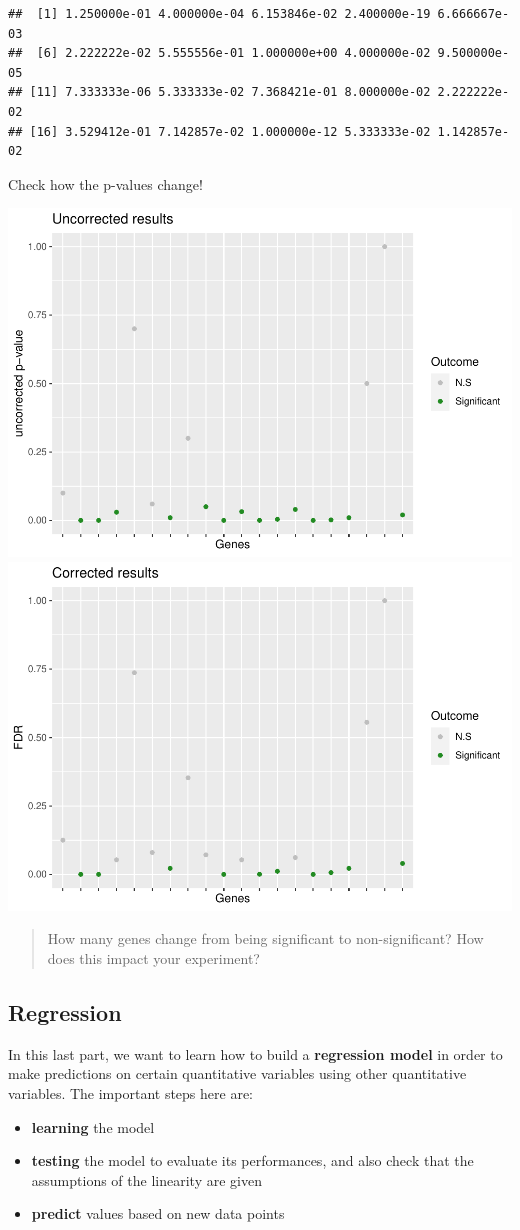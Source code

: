 \documentclass[
]{book}
\providecommand{\tightlist}{%
  \setlength{\itemsep}{0pt}\setlength{\parskip}{0pt}}
\begin{document}
\begin{verbatim}
##  [1] 1.250000e-01 4.000000e-04 6.153846e-02 2.400000e-19 6.666667e-03
##  [6] 2.222222e-02 5.555556e-01 1.000000e+00 4.000000e-02 9.500000e-05
## [11] 7.333333e-06 5.333333e-02 7.368421e-01 8.000000e-02 2.222222e-02
## [16] 3.529412e-01 7.142857e-02 1.000000e-12 5.333333e-02 1.142857e-02
\end{verbatim}

Check how the p-values change!

\includegraphics[width=0.5\linewidth]{_main_files/figure-latex/unnamed-chunk-147-1}
\includegraphics[width=0.5\linewidth]{_main_files/figure-latex/unnamed-chunk-147-2}

\begin{quote}
How many genes change from being significant to non-significant? How does this impact your experiment?
\end{quote}

\hypertarget{regression}{%
\subsection{Regression}\label{regression}}

In this last part, we want to learn how to build a \textbf{regression model} in order to make predictions on certain quantitative variables using other quantitative variables. The important steps here are:

\begin{itemize}
\tightlist
\item
  \textbf{learning} the model
\item
  \textbf{testing} the model to evaluate its performances, and also check that the assumptions of the linearity are given
\item
  \textbf{predict} values based on new data points
\end{itemize}
\end{document}
